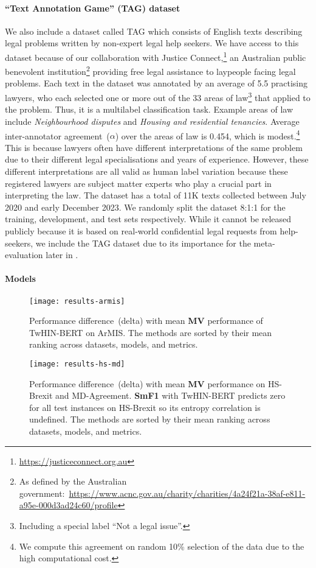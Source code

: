 \documentclass[shortpaper]{clv2025}
\newcommand{\methname}[1]{\textbf{#1}}  %
\begin{document}
\paragraph{``Text Annotation Game'' (TAG) dataset}

We also include a dataset called TAG which consists of English texts describing
legal problems written by non-expert legal help seekers. We have access to this
dataset because of our collaboration with Justice
Connect,\footnote{\url{https://justiceconnect.org.au}} an Australian public
benevolent institution\footnote{As defined by the Australian
  government:~\url{https://www.acnc.gov.au/charity/charities/4a24f21a-38af-e811-a95e-000d3ad24c60/profile}}
providing free legal assistance to laypeople facing legal problems. Each text in
the dataset was annotated by an average of 5.5 practising lawyers, who each
selected one or more out of the 33
areas of law\footnote{Including a special label ``Not a legal issue''.} that
applied to the problem. Thus, it is a multilabel classification task. Example
areas of law include \textit{Neighbourhood disputes} and \textit{Housing and
  residential tenancies}. Average inter-annotator agreement~($\alpha$) over the
areas of law is \num{0.454}, which is modest.\footnote{We compute this
  agreement on random 10\% selection of the data due to the high computational
  cost.} This is because lawyers often have different interpretations of the
same problem due to their different legal specialisations and years of
experience. However, these different interpretations are all valid as human
label variation because these registered lawyers are subject matter experts who play a crucial part in interpreting the law. The dataset has
a total of 11K texts collected between July 2020 and early December 2023. We
randomly split the dataset 8:1:1 for the training, development, and test sets
respectively. While it cannot be released publicly because it is based on
real-world confidential legal requests from help-seekers, we include the TAG
dataset due to its importance for the meta-evaluation later in
.

\paragraph{Models}

\begin{figure}
  \centering
  \texttt{[image: results-armis]}
  \caption{Performance difference~(delta) with mean \methname{MV} performance of
    TwHIN-BERT on ArMIS. The methods are sorted by their mean ranking across datasets,
    models, and metrics.}\label{fig:delta-mv-results-armis}
\end{figure}
\begin{figure}
  \centering
  \texttt{[image: results-hs-md]}
  \caption{Performance difference~(delta) with mean \methname{MV} performance on
    HS-Brexit and MD-Agreement. \methname{SmF1} with TwHIN-BERT predicts
    zero for all test instances on HS-Brexit so its entropy correlation is
    undefined. The methods are sorted by their mean ranking across datasets,
    models, and metrics.}\label{fig:delta-mv-results-hs-md}
\end{figure}
\end{document}
